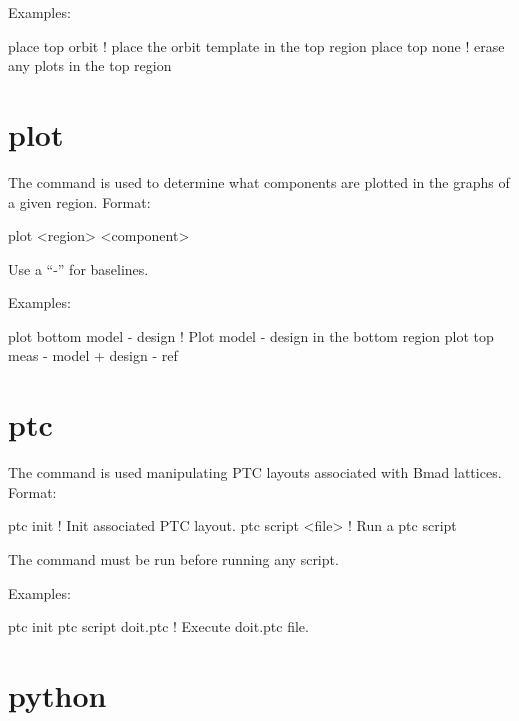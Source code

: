 Examples:
\begin{example}
  place top orbit  ! place the orbit template in the top region
  place top none   ! erase any plots in the top region
\end{example}

\section{plot}
\label{s:plot}

The  command is used to determine what components are plotted
in the graphs of a given region. Format:
\begin{example}
  plot <region> <component>
\end{example}

\vskip 0.2in 

Use a ``-'' for baselines. 

Examples:
\begin{example}
  plot bottom model - design       ! Plot model - design in the bottom region
  plot top meas - model + design - ref 
\end{example}

\section{ptc}
\label{s:ptc}

The  command is used manipulating PTC layouts associated with 
Bmad lattices. Format:
\begin{example}
  ptc init            ! Init associated PTC layout.
  ptc script <file>   ! Run a ptc script
\end{example}

\vskip 0.2in 

The  command must be run before running any script.

Examples:
\begin{example}
  ptc init
  ptc script doit.ptc  ! Execute doit.ptc file.
\end{example}

\section{python}
\label{s:python}

